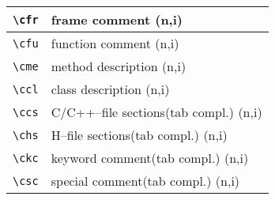 \documentclass[oneside,10pt,landscape,DIV17]{scrartcl}
\begin{document}
\begin{multicols}{3}
\begin{center}
\begin{tabular}[]{|p{13mm}|p{56mm}|}
\hline \verb'\cfr'& frame comment                           \hfill (n,i)\\
\hline \verb'\cfu'& function comment                        \hfill (n,i)\\
\hline \verb'\cme'& method description                      \hfill (n,i)\\
\hline \verb'\ccl'& class description                       \hfill (n,i)\\

\hline \verb'\ccs'& C/C++--file sections\hspace{3mm}\footnotesize{(tab compl.)}        \hfill \normalsize{(n,i)}\\
\hline \verb'\chs'& H--file sections\hspace{10mm}\footnotesize{(tab compl.)}           \hfill \normalsize{(n,i)}\\
\hline \verb'\ckc'& keyword comment\hspace{5mm}\footnotesize{(tab compl.)}             \hfill \normalsize{(n,i)}\\
\hline \verb'\csc'& special comment\hspace{7,5mm}\footnotesize{(tab compl.)}           \hfill \normalsize{(n,i)}\\


\end{tabular}
\end{center}
\end{multicols}
\end{document}
